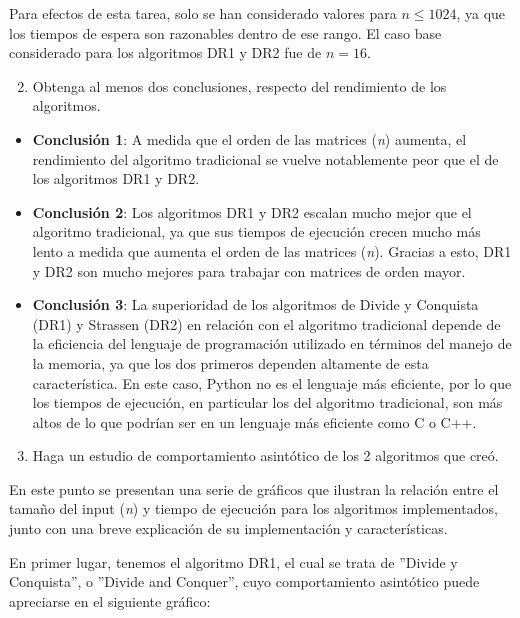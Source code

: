\documentclass[12pt]{report}
\begin{document}
  Para efectos de esta tarea, solo se han considerado valores para $ n \leq 1024 $, ya que los tiempos de espera son razonables dentro de ese rango. El caso base considerado para los algoritmos DR1 y DR2 fue de $n = 16$.
  
  \begin{enumerate}
    \setcounter{enumi}{1}
    \item Obtenga al menos dos conclusiones, respecto del rendimiento de los algoritmos.
  \end{enumerate}
  
  \begin{itemize}
    \item \textbf{Conclusión 1}: A medida que el orden de las matrices (\textit{n}) aumenta, el rendimiento del algoritmo tradicional se vuelve notablemente peor que el de los algoritmos DR1 y DR2.
    \item \textbf{Conclusión 2}: Los algoritmos DR1 y DR2 escalan mucho mejor que el algoritmo tradicional, ya que sus tiempos de ejecución crecen mucho más lento a medida que aumenta el orden de las matrices (\textit{n}). Gracias a esto, DR1 y DR2 son mucho mejores para trabajar con matrices de orden mayor.
    \item \textbf{Conclusión 3}: La superioridad de los algoritmos de Divide y Conquista (DR1) y Strassen (DR2) en relación con el algoritmo tradicional depende de la eficiencia del lenguaje de programación utilizado en términos del manejo de la memoria, ya que los dos primeros dependen altamente de esta característica. En este caso, Python no es el lenguaje más eficiente, por lo que los tiempos de ejecución, en particular los del algoritmo tradicional, son más altos de lo que podrían ser en un lenguaje más eficiente como C o C++.
  \end{itemize}

  \newpage
  
  \begin{enumerate}
    \setcounter{enumi}{2}
    \item Haga un estudio de comportamiento asintótico de los 2 algoritmos que creó.
  \end{enumerate}
  
  En este punto se presentan una serie de gráficos que ilustran la relación entre el tamaño del input (\textit{n}) y tiempo de ejecución para los algoritmos implementados, junto con una breve explicación de su implementación y características.

  En primer lugar, tenemos el algoritmo DR1, el cual se trata de ''Divide y Conquista'', o ''Divide and Conquer'', cuyo comportamiento asintótico puede apreciarse en el siguiente gráfico:
  
\end{document}
